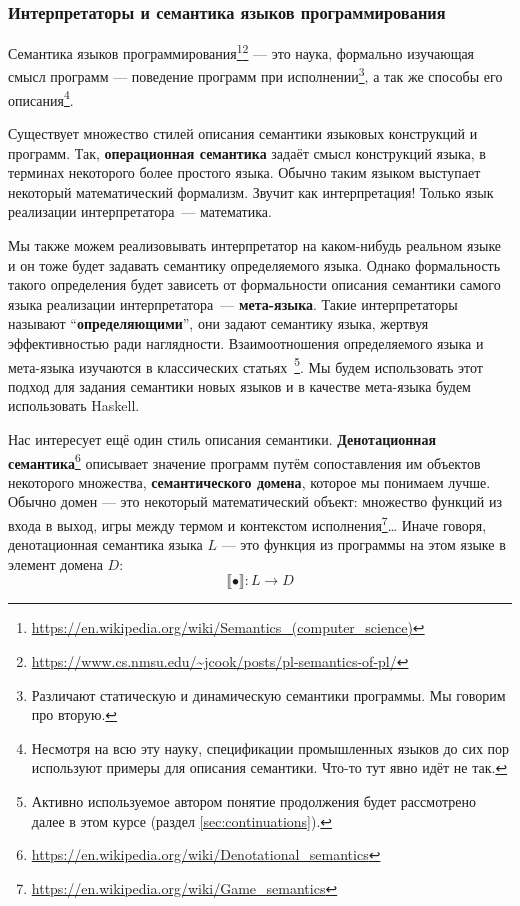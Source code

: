 \documentclass[12pt]{article}
\newcommand{\vocab}[1]{\textbf{#1}} %
\newcommand{\sembr}[1]{\llbracket{#1}\rrbracket} %
\begin{document}
    \subsubsection{Интерпретаторы и семантика языков программирования}

    Семантика языков программирования\footnote{\url{https://en.wikipedia.org/wiki/Semantics_(computer_science)}\label{note:sema-wiki}}\footnote{\url{https://www.cs.nmsu.edu/~jcook/posts/pl-semantics-of-pl/}\label{note:sema-cook}} --- это наука, формально изучающая смысл программ --- поведение программ при исполнении\footnote{Различают статическую и динамическую семантики программы. Мы говорим про вторую.}, а так же способы его описания\footnote{Несмотря на всю эту науку, спецификации промышленных языков до сих пор используют примеры для описания семантики. Что-то тут явно идёт не так.}.

    Существует множество стилей описания семантики языковых конструкций и программ.
    Так, \vocab{операционная семантика} задаёт смысл конструкций языка, в терминах некоторого более простого языка.
    Обычно таким языком выступает некоторый математический формализм.
    Звучит как интерпретация!
    Только язык реализации интерпретатора~--- математика.

    Мы также можем реализовывать интерпретатор на каком-нибудь реальном языке и он тоже будет задавать семантику определяемого языка.
    Однако формальность такого определения будет зависеть от формальности описания семантики самого языка реализации интерпретатора~--- \vocab{мета-языка}.
    Такие интерпретаторы называют ``\vocab{определяющими}'', они задают семантику языка, жертвуя эффективностью ради наглядности.
    Взаимоотношения определяемого языка и мета-языка изучаются в классических статьях~\cite{reynolds1972definitional,reynolds1998definitional}\footnote{Активно используемое автором понятие продолжения будет рассмотрено далее в этом курсе (раздел \ref{sec:continuations}).}.
    Мы будем использовать этот подход для задания семантики новых языков и в качестве мета-языка будем использовать Haskell.

    Нас интересует ещё один стиль описания семантики.
    \vocab{Денотационная семантика}\footnote{\url{https://en.wikipedia.org/wiki/Denotational_semantics}} описывает значение программ путём сопоставления им объектов некоторого множества, \vocab{семантического домена}, которое мы понимаем лучше.
    Обычно домен --- это некоторый математический объект: множество функций из входа в выход, игры между термом и контекстом исполнения\footnote{\url{https://en.wikipedia.org/wiki/Game_semantics}}\ldots
    Иначе говоря, денотационная семантика языка $L$ --- это функция из программы на этом языке в элемент домена $D$:
    \[
        \sembr{\bullet} : L \to D
    \]
\end{document}
